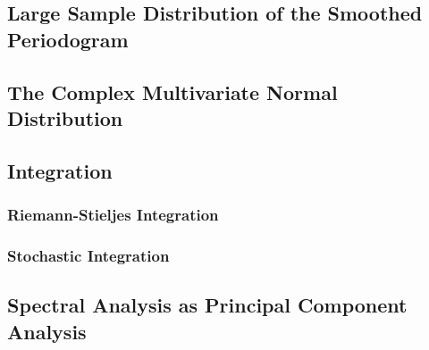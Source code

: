 \documentclass[12pt]{article}
\begin{document}
\subsection{Large Sample Distribution of the Smoothed Periodogram}

\subsection{The Complex Multivariate Normal Distribution}

\subsection{Integration}
\subsubsection{Riemann-Stieljes Integration}

\subsubsection{Stochastic Integration}

\subsection{Spectral Analysis as Principal Component Analysis}
\end{document}
